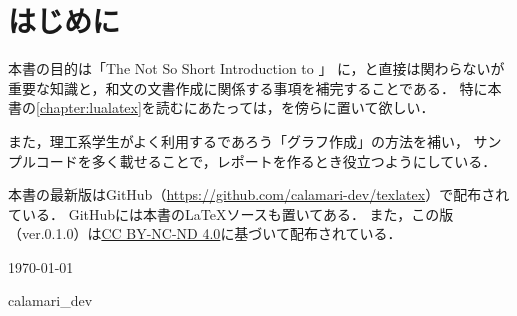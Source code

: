 \documentclass[../index]{subfiles}
\begin{document}
\chapter*{はじめに}
本書の目的は「The Not So Short Introduction to \LaTeXe 」\cite{Tobias2021}
に，\LaTeXe と直接は関わらないが重要な知識と，和文の文書作成に関係する事項を補完することである．
特に本書の\cref{chapter:lualatex}を読むにあたっては，\cite{Tobias2021}を傍らに置いて欲しい．

また，理工系学生がよく利用するであろう「グラフ作成」の方法を補い，
サンプルコードを多く載せることで，レポートを作るとき役立つようにしている．

本書の最新版はGitHub（\url{https://github.com/calamari-dev/texlatex}）で配布されている．
GitHubには本書の\LaTeX ソースも置いてある．
また，この版（ver.0.1.0）は\href{https://creativecommons.org/licenses/by-nc-nd/4.0/deed.ja}{CC BY-NC-ND 4.0}に基づいて配布されている．

\begin{flushright}
  \today

  calamari\_dev
\end{flushright}
\end{document}
